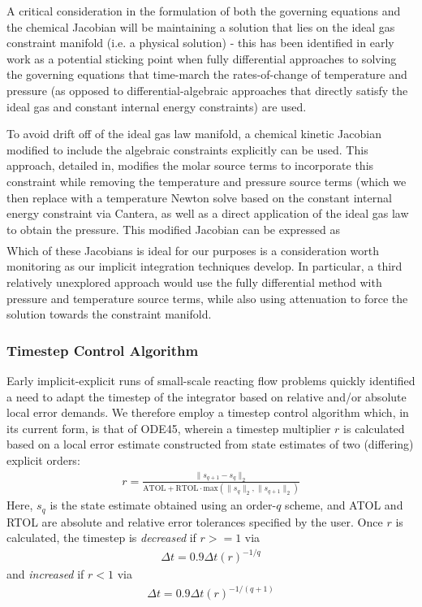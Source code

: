 A critical consideration in the formulation of both the governing equations
and the chemical Jacobian will be maintaining a solution
that lies on the ideal gas constraint manifold (i.e. a physical solution) - this
has been identified in early work as a potential sticking point when fully
differential approaches to solving the governing equations that time-march
the rates-of-change of temperature and pressure (as opposed to
differential-algebraic approaches that directly satisfy the ideal gas and
constant internal energy constraints) are used.

To avoid drift off of the ideal gas law manifold, a chemical
kinetic Jacobian modified to include the algebraic constraints explicitly can
be used. This approach, detailed in, modifies the molar source terms to incorporate
this constraint while removing the temperature and pressure source terms (which
we then replace with a temperature Newton solve based on the constant internal
energy constraint via Cantera, as well as a direct application of the ideal
gas law to obtain the pressure. This modified Jacobian can be expressed as
\begin{align}
\end{align}
Which of these Jacobians is ideal for our purposes is a consideration worth
monitoring as our implicit integration techniques develop. In particular, 
a third relatively unexplored approach would use the fully differential
method with pressure and temperature source terms, while also using attenuation
to force the solution towards the constraint manifold.

\subsubsection{Timestep Control Algorithm}

Early implicit-explicit runs of small-scale reacting flow problems
quickly identified a need to adapt the timestep of the integrator based
on relative and/or absolute local error demands. We therefore employ a
timestep control algorithm which, in its current form, is that of ODE45, wherein
a timestep multiplier $r$ is calculated based on a local error estimate constructed from
state estimates of two (differing) explicit orders:
\begin{align}
r = \frac{\|s_{q+1} - s_{q}\|_{2}}{\text{ATOL} + \text{RTOL} \cdot \text{max}(\|s_{q}\|_{2}, \|s_{q+1}\|_{2})}
\end{align}
Here, $s_{q}$ is the state estimate obtained using an order-$q$ scheme, and ATOL and RTOL are absolute and
relative error tolerances specified by the user. Once $r$ is calculated, the timestep is \emph{decreased} if
$r>=1$ via
\begin{align}
\Delta t = 0.9\Delta t (r)^{-1/q}
\end{align}
and \emph{increased} if $r<1$ via
\begin{align}
\Delta t = 0.9\Delta t (r)^{-1/(q+1)}
\end{align}

